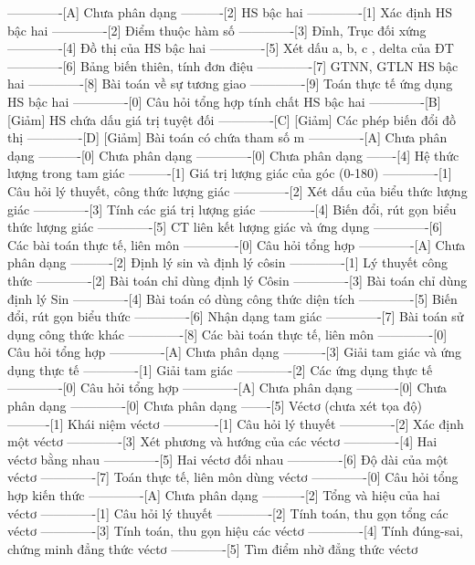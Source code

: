-------------[A] Chưa phân dạng
----------[2] HS bậc hai
-------------[1] Xác định HS bậc hai
-------------[2] Điểm thuộc hàm số
-------------[3] Đỉnh, Trục đối xứng
-------------[4] Đồ thị của HS bậc hai
-------------[5] Xét dấu a, b, c , delta của ĐT
-------------[6] Bảng biến thiên, tính đơn điệu
-------------[7] GTNN, GTLN HS bậc hai
-------------[8] Bài toán về sự tương giao
-------------[9] Toán thực tế ứng dụng HS bậc hai
-------------[0] Câu hỏi tổng hợp tính chất HS bậc hai
-------------[B] [Giảm] HS chứa dấu giá trị tuyệt đối
-------------[C] [Giảm] Các phép biến đổi đồ thị 
-------------[D] [Giảm] Bài toán có chứa tham số m
-------------[A] Chưa phân dạng
----------[0] Chưa phân dạng
-------------[0] Chưa phân dạng
-------[4] Hệ thức lượng trong tam giác
----------[1] Giá trị lượng giác của góc (0-180)
-------------[1] Câu hỏi lý thuyết, công thức lượng giác
-------------[2] Xét dấu của biểu thức lượng giác
-------------[3] Tính các giá trị lượng giác
-------------[4] Biến đổi, rút gọn biểu thức lượng giác
-------------[5] CT liên kết lượng giác và ứng dụng
-------------[6] Các bài toán thực tế, liên môn
-------------[0] Câu hỏi tổng hợp
-------------[A] Chưa phân dạng
----------[2] Định lý sin và định lý côsin
-------------[1] Lý thuyết công thức
-------------[2] Bài toán chỉ dùng định lý Côsin
-------------[3] Bài toán chỉ dùng định lý Sin 
-------------[4] Bài toán có dùng công thức diện tích
-------------[5] Biến đổi, rút gọn biểu thức
-------------[6] Nhận dạng tam giác
-------------[7] Bài toán sử dụng công thức khác
-------------[8] Các bài toán thực tế, liên môn
-------------[0] Câu hỏi tổng hợp
-------------[A] Chưa phân dạng
----------[3] Giải tam giác và ứng dụng thực tế
-------------[1] Giải tam giác
-------------[2] Các ứng dụng thực tế
-------------[0] Câu hỏi tổng hợp
-------------[A] Chưa phân dạng
----------[0] Chưa phân dạng
-------------[0] Chưa phân dạng
-------[5] Véctơ (chưa xét tọa độ)
----------[1] Khái niệm véctơ
-------------[1] Câu hỏi lý thuyết
-------------[2] Xác định một véctơ
-------------[3] Xét phương và hướng của các véctơ
-------------[4] Hai véctơ bằng nhau
-------------[5] Hai véctơ đối nhau
-------------[6] Độ dài của một véctơ
-------------[7] Toán thực tế, liên môn dùng véctơ
-------------[0] Câu hỏi tổng hợp kiến thức
-------------[A] Chưa phân dạng
----------[2] Tổng và hiệu của hai véctơ
-------------[1] Câu hỏi lý thuyết
-------------[2] Tính toán, thu gọn tổng các véctơ
-------------[3] Tính toán, thu gọn hiệu các véctơ
-------------[4] Tính đúng-sai, chứng minh đẳng thức véctơ
-------------[5] Tìm điểm nhờ đẳng thức véctơ
